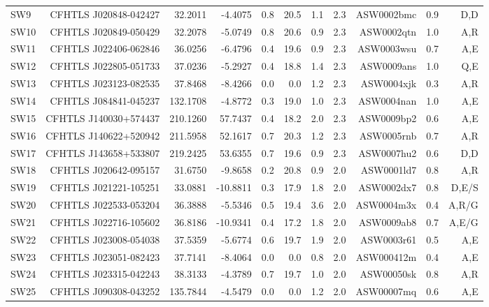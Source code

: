 \documentclass[useAMS,usenatbib,a4paper]{mn2e}
\begin{document}
\begin{center}
\begin{longtable}{lrrrrrrrrrr}
 SW9 & CFHTLS J020848-042427 &   32.2011 &   -4.4075 &  0.8 & 20.5 &  1.1 &  2.3 & ASW0002bmc &  0.9  &  D,D   \\ 
SW10 & CFHTLS J020849-050429 &   32.2078 &   -5.0749 &  0.8 & 20.6 &  0.9 &  2.3 & ASW0002qtn &  1.0  &  A,R   \\ 
SW11 & CFHTLS J022406-062846 &   36.0256 &   -6.4796 &  0.4 & 19.6 &  0.9 &  2.3 & ASW0003wsu &  0.7  &  A,E   \\ 
SW12 & CFHTLS J022805-051733 &   37.0236 &   -5.2927 &  0.4 & 18.8 &  1.4 &  2.3 & ASW0009ans &  1.0  &  Q,E   \\ 
SW13 & CFHTLS J023123-082535 &   37.8468 &   -8.4266 &  0.0 &  0.0 &  1.2 &  2.3 & ASW0004xjk &  0.3  &  A,R   \\ 
SW14 & CFHTLS J084841-045237 &  132.1708 &   -4.8772 &  0.3 & 19.0 &  1.0 &  2.3 & ASW0004nan &  1.0  &  A,E   \\ 
SW15 & CFHTLS J140030+574437 &  210.1260 &   57.7437 &  0.4 & 18.2 &  2.0 &  2.3 & ASW0009bp2 &  0.6  &  A,E   \\ 
SW16 & CFHTLS J140622+520942 &  211.5958 &   52.1617 &  0.7 & 20.3 &  1.2 &  2.3 & ASW0005rnb &  0.7  &  A,R   \\ 
SW17 & CFHTLS J143658+533807 &  219.2425 &   53.6355 &  0.7 & 19.6 &  0.9 &  2.3 & ASW0007hu2 &  0.6  &  D,D   \\ 
SW18 & CFHTLS J020642-095157 &   31.6750 &   -9.8658 &  0.2 & 20.8 &  0.9 &  2.0 & ASW0001ld7 &  0.8  &  A,R   \\ 
SW19 & CFHTLS J021221-105251 &   33.0881 &  -10.8811 &  0.3 & 17.9 &  1.8 &  2.0 & ASW0002dx7 &  0.8  &  D,E/S   \\ 
SW20 & CFHTLS J022533-053204 &   36.3888 &   -5.5346 &  0.5 & 19.4 &  3.6 &  2.0 & ASW0004m3x &  0.4  &  A,R/G   \\ 
SW21 & CFHTLS J022716-105602 &   36.8186 &  -10.9341 &  0.4 & 17.2 &  1.8 &  2.0 & ASW0009ab8 &  0.7  &  A,E/G   \\ 
SW22 & CFHTLS J023008-054038 &   37.5359 &   -5.6774 &  0.6 & 19.7 &  1.9 &  2.0 & ASW0003r61 &  0.5  &  A,E   \\ 
SW23 & CFHTLS J023051-082423 &   37.7141 &   -8.4064 &  0.0 &  0.0 &  0.8 &  2.0 & ASW000412m &  0.4  &  A,E   \\ 
SW24 & CFHTLS J023315-042243 &   38.3133 &   -4.3789 &  0.7 & 19.7 &  1.0 &  2.0 & ASW00050sk &  0.8  &  A,R   \\ 
SW25 & CFHTLS J090308-043252 &  135.7844 &   -4.5479 &  0.0 &  0.0 &  1.2 &  2.0 & ASW00007mq &  0.6  &  A,E   \\ 

\end{longtable}
\end{center}
\end{document}
